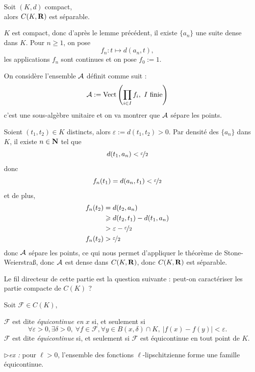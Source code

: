 \documentclass[a4paper,11pt, twoside]{article}
\begin{document}
\begin{lemme}
  Soit $(K,d)$ compact,\\

  alors $C(K,\mathbf R)$ est séparable.
\end{lemme}

\begin{Proof}
  $K$ est compact, donc d'après le lemme précédent, il existe $\{a_n\}$ une suite dense dans $K$. Pour $n\geqslant 1$, on pose 
  $$f_n:t\longmapsto d(a_n,t),$$
  les applications $f_n$ sont continues et on pose $f_0:=1$.

  On considère l'ensemble $\mathcal A$ définit comme suit :
  $$\A:=\mathrm{Vect}\left(\prod_{i\in I}f_i,\ I\text{ finie}\right)$$
  c'est une sous-algèbre unitaire et on va montrer que $\mathcal A$ sépare les points.

  Soient $(t_1,t_2)\in K$ distincts, alors $\varepsilon:=d(t_1,t_2)>0$. Par densité des $\{a_n\}$ dans $K$, il existe $n\in\mathbf N$ tel que 
  $$d(t_1,a_n)<\nicefrac{\varepsilon}{2}$$
  donc 
  $$f_n(t_1)=d(a_n,t_1)<\nicefrac{\varepsilon}{2}$$
  et de plus,
  \begin{align*}
    f_n(t_2)&=d(t_2,a_n)\\
    &\geqslant d(t_2,t_1)-d(t_1,a_n)\\
    &>\varepsilon-\nicefrac{\varepsilon}{2}\\
    f_n(t_2)&>\nicefrac{\varepsilon}{2}
  \end{align*}
  donc $\mathcal A$ sépare les points, ce qui nous permet d'appliquer le théorème de Stone-Weierstra\ss, donc $\mathcal A$ est dense dans $C(K,\mathbf R)$, donc $C(K,\mathbf R)$ est séparable.
\end{Proof}





Le fil directeur de cette partie est la question suivante : peut-on caractériser les partie compacte de $C(K)$ ?


\begin{Def}
  Soit $\mathcal F\in C(K)$,

  $\mathcal F$ est dite \emph{équicontinue en }$x$ si, et seulement si
  $$\forall \varepsilon>0, \exists\delta>0,\ \forall f\in\mathcal F, \forall y\in B(x,\delta)\cap K,\ |f(x)-f(y)|<\varepsilon.$$
  $\mathcal F$ est dite \emph{équicontinue} si, et seulement si $\mathcal F$ est équicontinue en tout point de $K$.
\end{Def}

$\triangleright$\emph{ex : }pour $\ell>0$, l'ensemble des fonctions $\ell$-lipschitzienne forme une famille équicontinue.
\end{document}
